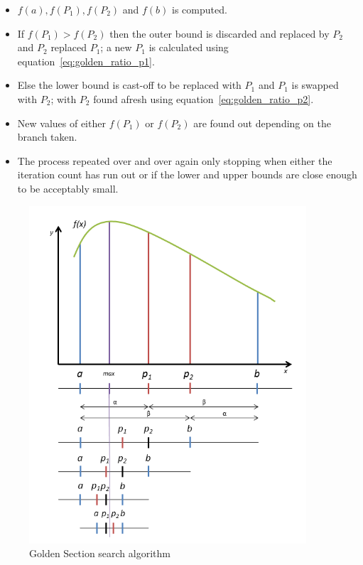 {\begin{itemize}
\begin{equation}
	\begin{aligned}
		 P_{2}=a+\phi(b-a)
		\label{eq:golden_ratio_p2}
	\end{aligned}
\end{equation}


	\item $\textit{f}(a),\textit{f}(P_{1}),\textit{f}(P_{2})$ and $\textit{f}(b)$ is computed.
	\item If $\textit{f}(P_{1}) > \textit{f}(P_{2})$ then the outer bound is discarded and replaced by $ P_{2} $ and $ P_{2}$ replaced $ P_{1}$; a new $ P_{1}$ is calculated using equation~\ref{eq:golden_ratio_p1}.
	\item Else the lower bound is cast-off to be replaced with $ P_{1}$ and $ P_{1}$ is swapped with $ P_{2}$; with $ P_{2}$ found afresh using equation~\ref{eq:golden_ratio_p2}.
	\item New values of either $\textit{f}(P_{1})$ or $\textit{f}(P_{2})$ are found out depending on the branch taken.
	\item  The process repeated over and over again only stopping when either the iteration count has run out or if the lower and upper bounds are close enough to be acceptably small. 
\end{itemize}

 
\begin{figure}[H]
  \begin{center}
  \includegraphics[width=0.92\textwidth]{images/Golden_search_curve}
  \caption{ Golden Section search algorithm }
  \label{fig:Golden_search_curve}
  \end{center}
  \end{figure}
  
}
